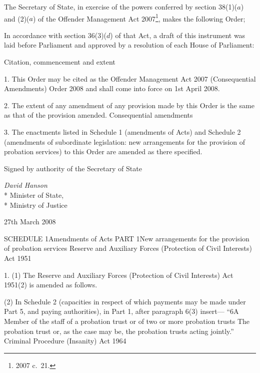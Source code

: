 \documentclass[12pt,a4paper]{article}
\title{\regstitle}
\author{S.I.\ 2008 No.\ 912}
\date{Made
27th March 2008\\
Coming into force
1st April 2008
}
\begin{document}
\maketitle

\noindent
The Secretary of State, in exercise of the powers conferred by section 38(1)($a$)  and (2)($a$)  of the Offender Management Act 2007\footnote{2007 c.~21.}, makes the following Order;

In accordance with section 36(3)($d$)  of that Act, a draft of this instrument was laid before Parliament and approved by a resolution of each House of Parliament: 

{\sloppy

\tableofcontents

}

\bigskip

\setcounter{secnumdepth}{-2}

Citation, commencement and extent

1.  This Order may be cited as the Offender Management Act 2007 (Consequential Amendments) Order 2008 and shall come into force on 1st April 2008.

2.  The extent of any amendment of any provision made by this Order is the same as that of the provision amended.
Consequential amendments

3.  The enactments listed in Schedule 1 (amendments of Acts) and Schedule 2 (amendments of subordinate legislation: new arrangements for the provision of probation services) to this Order are amended as there specified. 

\bigskip

Signed 
by authority of the 
Secretary of State

{\raggedleft
\emph{David Hanson}\\*
Minister
of State,\\*%
Ministry of Justice

}

27th March 2008

\small

SCHEDULE 1Amendments of Acts
PART 1New arrangements for the provision of probation services
Reserve and Auxiliary Forces (Protection of Civil Interests) Act 1951

1.  (1)  The Reserve and Auxiliary Forces (Protection of Civil Interests) Act 1951(2) is amended as follows.

(2) In Schedule 2 (capacities in respect of which payments may be made under Part 5, and paying authorities), in Part 1, after paragraph 6(3) insert—
“6A Member of the staff of a probation trust or of two or more probation trusts	The probation trust or, as the case may be, the probation trusts acting jointly.”
Criminal Procedure (Insanity) Act 1964
\end{document}
